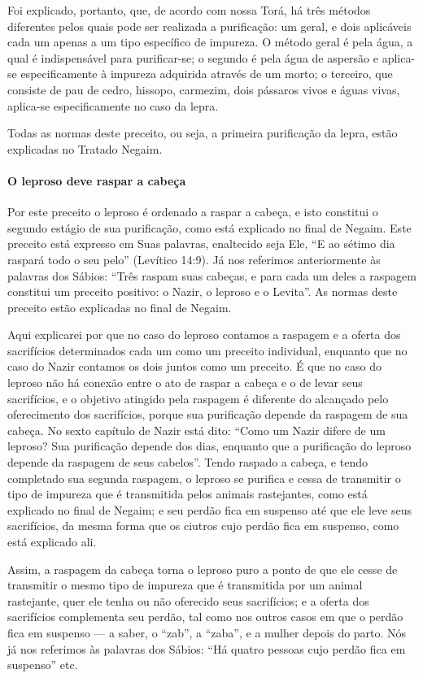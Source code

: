 Foi explicado, portanto, que, de acordo com nossa Torá, há três
métodos diferentes pelos quais pode ser realizada a purificação: um
geral, e dois aplicáveis cada um apenas a um tipo específico de
impureza. O método geral é pela água, a qual é indispensável para
purificar-se; o segundo é pela água de aspersão e aplica-se
especificamente à impureza adquirida através de um morto; o terceiro,
que consiste de pau de cedro, hissopo, carmezim, dois pássaros vivos e
águas vivas, aplica-se especificamente no caso da lepra.

Todas as normas deste preceito, ou seja, a primeira purificação da
lepra, estão explicadas no Tratado Negaim.

\paragraph{O leproso deve raspar a cabeça}

Por este preceito o leproso é ordenado a raspar a cabeça, e isto
constitui o segundo estágio de sua purificação, como está explicado no
final de Negaim. Este preceito está expresso em Suas palavras,
enaltecido seja Ele, ``E ao sétimo dia raspará todo o seu pelo''
(Levítico 14:9). Já nos referimos anteriormente às palavras dos Sábios:
``Três raspam suas cabeças, e para cada um deles
a raspagem constitui um preceito positivo: o Nazir, o leproso e o
Levita''. As normas deste preceito estão explicadas no final de Negaim.

Aqui explicarei por que no caso do leproso contamos a raspagem e a
oferta dos sacrifícios determinados cada um como um preceito individual,
enquanto que no caso do Nazir contamos os dois juntos como um preceito.
É que no caso do leproso não há conexão entre o ato de raspar a cabeça e
o de levar seus sacrifícios, e o objetivo atingido pela raspagem é
diferente do alcançado pelo oferecimento dos sacrifícios, porque sua
purificação depende da raspagem de sua cabeça. No sexto capítulo de
Nazir está dito: ``Como um Nazir difere de um leproso? Sua purificação
depende dos dias, enquanto que a purificação do leproso depende da
raspagem de seus cabelos''. Tendo raspado a cabeça, e tendo completado
sua segunda raspagem, o leproso se purifica e cessa de transmitir o tipo
de impureza que é transmitida pelos animais rastejantes, como está
explicado no final de Negaim; e seu perdão fica em suspenso até que ele
leve seus sacrifícios, da mesma forma que os ciutros cujo perdão fica em
suspenso, como está explicado ali.

Assim, a raspagem da cabeça torna o leproso puro a ponto de que ele
cesse de transmitir o mesmo tipo de impureza que é transmitida por um
animal rastejante, quer ele tenha ou não oferecido seus sacrifícios; e a
oferta dos sacrifícios complementa seu perdão, tal como nos outros casos
em que o perdão fica em suspenso --- a saber, o ``zab'', a ``zaba'', e a
mulher depois do parto. Nós já nos referimos às palavras dos Sábios:
``Há quatro pessoas cujo perdão fica em suspenso'' etc.

